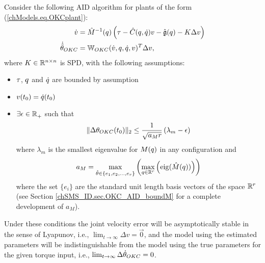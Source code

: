 \begin{OKC_AID} \label{chSMS_ID.theo.OKC_AID}
  Consider the following \ac{AID} algorithm for plants of the form
  (\ref{chModels.eq.OKCplant}):
%
  \begin{align}
    \dot{v}&=\hat{M}^{-1}(q) \left(\tau - \hat{C}(q,\dot{q}) v
      -\hat{\mathfrak{g}}(q)- K\Delta v\right)
                                              \label{chSMS_ID.eq.OKC_AID_estimator}\\
    \dot{\hat{\theta}}_{OKC}&= \mathbb{W}_{OKC}(\dot{v},q,\dot{q},v)^T\Delta v,
                                              \label{chSMS_ID.eq.OKC_AID_identifier}
  \end{align}
%
  where $K\in\mathbb{R}^{n\times n}$ is \ac{SPD}, with the following assumptions:
%
  \begin{itemize}
  \item $\tau$, $q$ and $\dot{q}$ are bounded by assumption
  \item $v(t_0)=\dot{q}(t_0)$
  \item $\exists \epsilon \in \mathbb{R}^{}_+$ such that
% 
    \begin{equation}
      \label{chSMS_ID.eq.OKC_AID_massLowerBound}
      \|\Delta
      \theta_{OKC}(t_0)\|_2\leq \frac{1}{\sqrt{a_M r}}\left(\lambda_m-\epsilon\right)
    \end{equation}
%
    where $\lambda_m$ is the smallest eigenvalue for $M(q)$ in
    any configuration and 
%
\begin{equation}
  a_M=\max_{\hat{\theta}\in\{e_1,e_2,...,e_r\}}\left(\max_{q\in\mathbb{R}^{r}}\left(\operatorname{eig}(\hat{M}(q))\right)\right)
\end{equation}
%
where the set $\{e_i\}$ are the standard unit length basis vectors of the space $\mathbb{R}^{r}$
(see Section \ref{chSMS_ID.sec.OKC_AID_boundM} for a
    complete development of $a_M$).
  \end{itemize}
%
  \noindent Under these conditions the joint velocity error will
  be asymptotically stable in the sense of Lyapunov, i.e., $\lim_{t\to
    \infty}\Delta v =\vec{0}$, and the model using the estimated
  parameters will be indistinguishable from the model using the true
  parameters for the given torque input, i.e., $\lim_{t\to
    \infty}\Delta \dot{\theta}_{OKC}=0$.
\end{OKC_AID}

